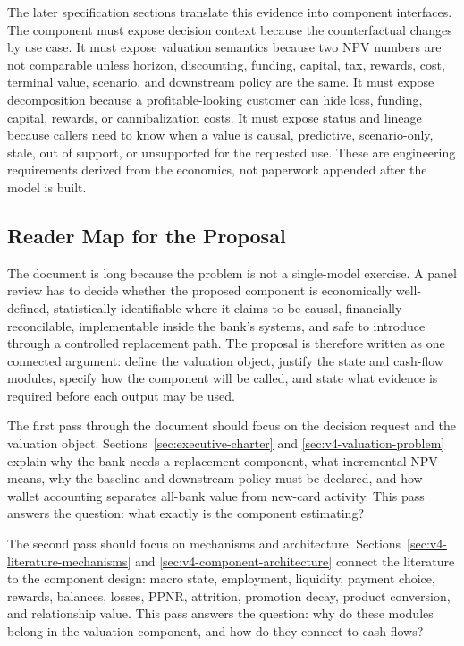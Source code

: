 \documentclass[11pt]{article}
\newcommand{\1}{\mathbf{1}}
\begin{document}
The later specification sections translate this evidence into component
interfaces. The component must expose decision context because the
counterfactual changes by use case. It must expose valuation semantics because
two NPV numbers are not comparable unless horizon, discounting, funding,
capital, tax, rewards, cost, terminal value, scenario, and downstream policy are
the same. It must expose decomposition because a profitable-looking customer
can hide loss, funding, capital, rewards, or cannibalization costs. It must
expose status and lineage because callers need to know when a value is causal,
predictive, scenario-only, stale, out of support, or unsupported for the
requested use. These are engineering requirements derived from the economics,
not paperwork appended after the model is built.

\subsection{Reader Map for the Proposal}
\label{sec:how-to-read}

The document is long because the problem is not a single-model exercise. A
panel review has to decide whether the proposed component is economically
well-defined, statistically identifiable where it claims to be causal,
financially reconcilable, implementable inside the bank's systems, and safe to
introduce through a controlled replacement path. The proposal is therefore
written as one connected argument: define the valuation object, justify the
state and cash-flow modules, specify how the component will be called, and state
what evidence is required before each output may be used.

The first pass through the document should focus on the decision request and
the valuation object. Sections~\ref{sec:executive-charter} and
\ref{sec:v4-valuation-problem} explain why the bank needs a replacement
component, what incremental NPV means, why the baseline and downstream policy
must be declared, and how wallet accounting separates all-bank value from
new-card activity. This pass answers the question: what exactly is the
component estimating?

The second pass should focus on mechanisms and architecture.
Sections~\ref{sec:v4-literature-mechanisms} and
\ref{sec:v4-component-architecture} connect the literature to the component
design: macro state, employment, liquidity, payment choice, rewards, balances,
losses, PPNR, attrition, promotion decay, product conversion, and relationship
value. This pass answers the question: why do these modules belong in the
valuation component, and how do they connect to cash flows?
\end{document}
